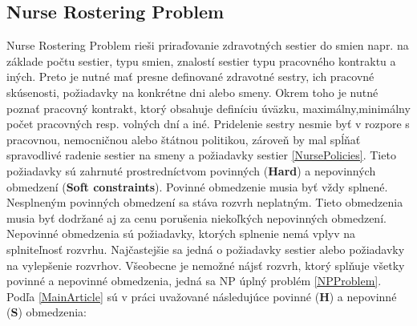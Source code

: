 \documentclass[a4paper, 14pt]{article}
\begin{document}
\subsection{Nurse Rostering Problem}

Nurse Rostering Problem rieši priraďovanie zdravotných sestier do smien napr. na základe počtu sestier, typu smien, znalostí sestier typu pracovného kontraktu a iných. Preto je nutné mať presne definované zdravotné sestry, ich pracovné skúsenosti, požiadavky na konkrétne dni alebo smeny. Okrem toho je nutné poznať pracovný kontrakt, ktorý obsahuje definíciu úväzku, maximálny,minimálny počet pracovných resp. volných dní a iné. Pridelenie sestry nesmie byť v rozpore s pracovnou, nemocničnou alebo štátnou politikou, zároveň by mal spĺňať spravodlivé radenie sestier na smeny a požiadavky sestier \ref{NursePolicies}. Tieto požiadavky sú zahrnuté prostredníctvom povinných (\textbf{Hard}) a nepovinných obmedzení (\textbf{Soft constraints}). Povinné obmedzenie musia byť vždy splnené. Nesplneným povinných obmedzení sa stáva rozvrh neplatným. Tieto obmedzenia musia byť dodržané aj za cenu porušenia niekoľkých nepovinných obmedzení. Nepovinné obmedzenia sú požiadavky, ktorých splnenie nemá vplyv na splniteľnosť rozvrhu. Najčastejšie sa jedná o požiadavky sestier alebo požiadavky na vylepšenie rozvrhov. Všeobecne je nemožné nájsť rozvrh, ktorý splňuje všetky povinné a nepovinné obmedzenia, jedná sa NP úplný problém \ref{NPProblem}. Podľa \ref{MainArticle} sú v práci uvažované následujúce povinné (\textbf{H}) a nepovinné (\textbf{S}) obmedzenia:
\end{document}
